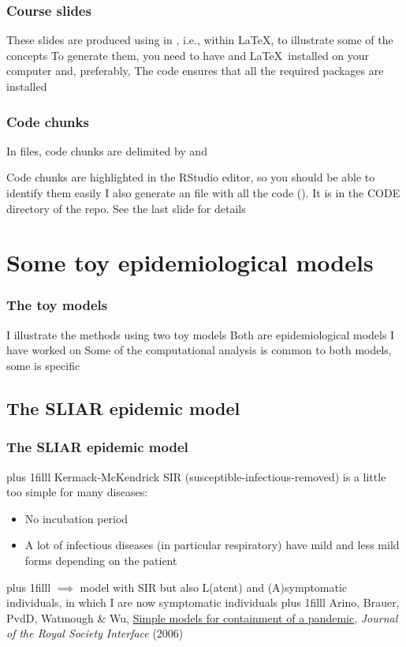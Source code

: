 \documentclass[aspectratio=169]{beamer}\usepackage[]{graphicx}\usepackage[]{xcolor}
\begin{document}
\begin{frame}\frametitle{Course slides}
These slides are produced using  in , i.e.,  within \LaTeX, to illustrate some of the concepts
\vfill
To generate them, you need to have  and \LaTeX\ installed on your computer and, preferably, 
\vfill
The code ensures that all the required packages are installed
\end{frame}

\begin{frame}[fragile]\frametitle{Code chunks}
In  files, code chunks are delimited by \code{<<>>=} and 

\vfill
Code chunks are highlighted in the RStudio editor, so you should be able to identify them easily
\vfill
I also generate an  file with all the code (). It is in the CODE directory of the repo. See the last slide for details
\end{frame}


\section{Some toy epidemiological models}

\begin{frame}\frametitle{The toy models}
I illustrate the methods using two toy models
\vfill
Both are epidemiological models I have worked on
\vfill
Some of the computational analysis is common to both models, some is specific
\end{frame}

\subsection{The SLIAR epidemic model}

\begin{frame}\frametitle{The SLIAR epidemic model}
\vskip0pt plus 1filll
Kermack-McKendrick SIR (susceptible-infectious-removed) is a little too simple for many diseases:
\begin{itemize}
\item No incubation period
\item A lot of infectious diseases (in particular respiratory) have mild and less mild forms depending on the patient
\end{itemize}
\vskip0pt plus 1filll
$\implies$ model with SIR but also L(atent) and (A)symptomatic individuals, in which I are now symptomatic individuals
\vskip0pt plus 1filll
\tiny
Arino, Brauer, PvdD, Watmough \& Wu, \href{http://dx.doi.org/10.1098/rsif.2006.0112}{Simple models for containment of a pandemic}, \emph{Journal of the Royal Society Interface} (2006)
\end{frame}
\end{document}
